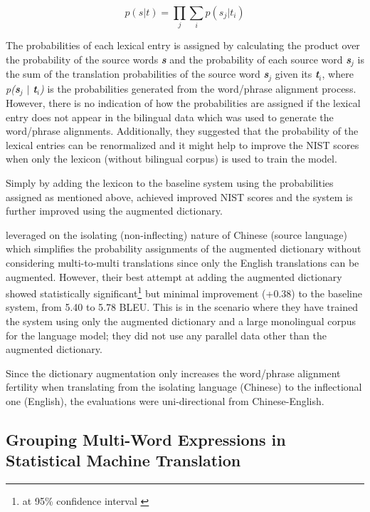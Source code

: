 \begin{equation}
p(s|t)=\prod _{ j }^{  }{ \sum _{ i }^{  }{ p({ s }_{ j }|{ t }_{ i }) }  } 
\end{equation}

The probabilities of each lexical entry is assigned by calculating the product over the probability of the source words \emph{\textbf{s}} and the probability of each source word \emph{\textbf{s${_j}$}} is the sum of the translation probabilities of the source word \emph{\textbf{s${_j}$}} given its \emph{\textbf{t${_i}$}}, where \emph{p(\textbf{s${_j}$} ${|}$ \textbf{t${_i}$})} is the probabilities generated from the word/phrase alignment process. However, there is no indication of how the probabilities are assigned if the lexical entry does not appear in the bilingual data which was used to generate the word/phrase alignments. Additionally, they suggested that the probability of the lexical entries can be renormalized and it might help to improve the NIST scores when only the lexicon (without bilingual corpus) is used to train the model.

Simply by adding the lexicon to the baseline system using the probabilities assigned as mentioned above, \cite{Vogel04augmentingmanual} achieved improved NIST scores and the system is further improved using the augmented dictionary. 

\cite{Vogel04augmentingmanual} leveraged on the isolating (non-inflecting) nature of Chinese (source language) which simplifies the probability assignments of the augmented dictionary without considering multi-to-multi translations since only the English translations can be augmented. However, their best attempt at adding the augmented dictionary showed statistically significant\footnote{at 95\% confidence interval \citep{zhang2004interpreting}} but minimal improvement (+0.38) to the baseline system, from 5.40 to 5.78 BLEU. This is in the scenario where they have trained the system using only the augmented dictionary and a large monolingual corpus for the language model; they did not use any parallel data other than the augmented dictionary.

Since the dictionary augmentation only increases the word/phrase alignment fertility when translating from the isolating language (Chinese) to the inflectional one (English), the evaluations were uni-directional from Chinese-English. 

\subsection{Grouping Multi-Word Expressions in Statistical Machine Translation}

